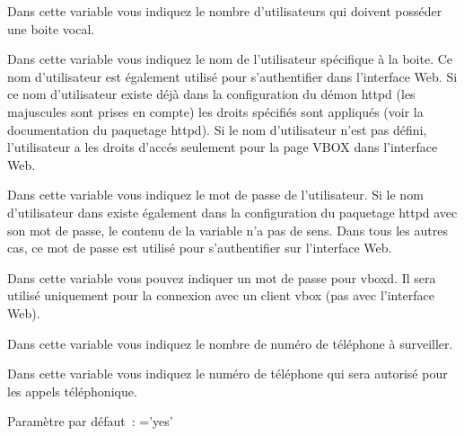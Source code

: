 \begin{description}


    Dans cette variable vous indiquez le nombre d'utilisateurs qui doivent posséder une boite vocal.


	Dans cette variable vous indiquez le nom de l'utilisateur spécifique à la boite. Ce nom
	d'utilisateur est également utilisé pour s'authentifier dans l'interface Web. Si ce nom
	d'utilisateur existe déjà dans la configuration du démon httpd (les majuscules sont prises
	en compte) les droits spécifiés sont appliqués (voir la documentation du paquetage httpd).
	Si le nom d'utilisateur n'est pas défini, l'utilisateur a les droits d'accés seulement pour
	la page VBOX dans l'interface Web.


    Dans cette variable vous indiquez le mot de passe de l'utilisateur. Si le nom d'utilisateur
	dans  existe également dans la configuration du paquetage httpd
	avec son mot de passe, le contenu de la variable  n'a pas de
	sens. Dans tous les autres cas, ce mot de passe est utilisé pour s'authentifier sur l'interface
	Web.


    Dans cette variable vous pouvez indiquer un mot de passe pour vboxd. Il sera utilisé uniquement
	pour la connexion avec un client vbox (pas avec l'interface Web).


    Dans cette variable vous indiquez le nombre de numéro de téléphone à surveiller.


    Dans cette variable vous indiquez le numéro de téléphone qui sera autorisé pour les appels
	téléphonique.


    Paramètre par défaut~: ='yes'


\end{description}
